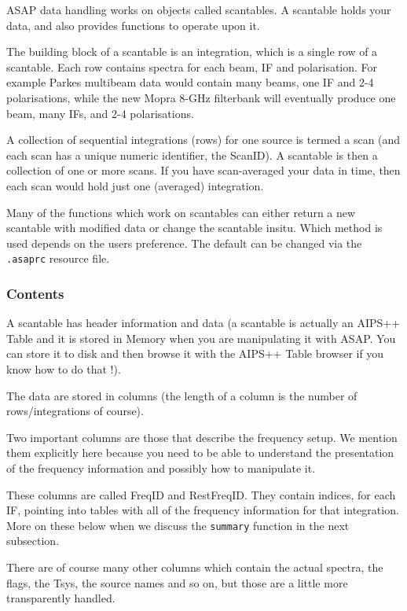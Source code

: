 \documentclass[11pt]{article}
\newcommand{\cmd}[1]{{\tt #1}}
\begin{document}
ASAP data handling works on objects called scantables.  A scantable
holds your data, and also provides functions to operate
upon it.

The building block of a scantable is an integration, which is a single
row of a scantable. Each row contains spectra for each beam, IF and
polarisation. For example Parkes multibeam data would contain many
beams, one IF and 2-4 polarisations, while the new Mopra 8-GHz
filterbank will eventually produce one beam, many IFs, and 2-4
polarisations.

A collection of sequential integrations (rows) for one source is termed
a scan (and each scan has a unique numeric identifier, the ScanID). A
scantable is then a collection  of one or more scans. If you have
scan-averaged your data in time, then each scan would  hold just one
(averaged) integration.

Many of the functions which work on scantables can either return a
new scantable with modified data or change the scantable insitu. Which
method is used depends on the users preference. The default can be
changed via the {\tt .asaprc} resource file.

\subsubsection {Contents}

A scantable has header information and data (a scantable is actually an AIPS++
Table and it is stored in Memory when you are manipulating it with ASAP.
You can store it to disk and then browse it with the AIPS++
Table browser if you know how to do that !).

The data are stored in columns (the length of a column is the number of
rows/integrations of course).

Two important columns are those that describe the frequency setup.  We mention
them explicitly here because you need to be able to understand the presentation
of the frequency information and possibly how to manipulate it.

These columns are called FreqID and RestFreqID.  They contain indices, for
each IF, pointing into tables with all of the frequency information for that
integration.   More on these below when we discuss the \cmd{summary} function
in the next subsection.

There are of course many other columns which contain the actual spectra,
the flags, the Tsys, the source names and so on, but those are a little
more transparently handled.
\end{document}
